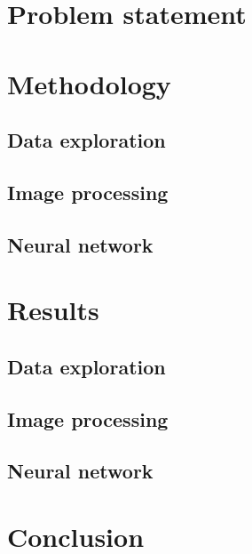 \documentclass[10pt, final]{article}
\begin{document}
	\section{Problem statement}
	\section{Methodology}
	\subsection{Data exploration}
	\subsection{Image processing}
	\subsection{Neural network}
	\section{Results}
	\subsection{Data exploration}
	\subsection{Image processing}
	\subsection{Neural network}
	\section{Conclusion}
	\listoffigures
	\listoftables
	\printbibliography
\end{document}
